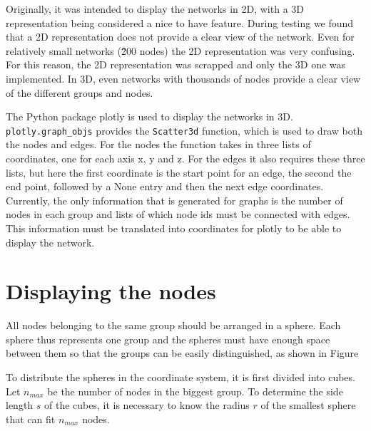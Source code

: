 Originally, it was intended to display the networks in 2D, with a 3D representation being considered a nice to have feature. During testing we found that a 2D representation does not provide a clear view of the network. Even for relatively small networks (\~200 nodes) the 2D representation was very confusing. For this reason, the 2D representation was scrapped and only the 3D one was implemented. In 3D, even networks with thousands of nodes provide a clear view of the different groups and nodes.
\newline

The Python package plotly \cite{plotly} is used to display the networks in 3D. \texttt{plotly.graph\_objs} provides the \texttt{Scatter3d} function, which is used to draw both the nodes and edges. For the nodes the function takes in three lists of coordinates, one for each axis x, y and z. For the edges it also requires these three lists, but here the first coordinate is the start point for an edge, the second the end point, followed by a None entry and then the next edge coordinates. Currently, the only information that is generated for graphs is the number of nodes in each group and lists of which node ids must be connected with edges. This information must be translated into coordinates for plotly to be able to display the network.

\section{Displaying the nodes}
\label{sub:displayNodes}
All nodes belonging to the same group should be arranged in a sphere. Each sphere thus represents one group and the spheres must have enough space between them so that the groups can be easily distinguished, as shown in Figure %

To distribute the spheres in the coordinate system, it is first divided into cubes. Let $n_{max}$ be the number of nodes in the biggest group. To determine the side length $s$ of the cubes, it is necessary to know the radius $r$ of the smallest sphere that can fit $n_{max}$ nodes.

